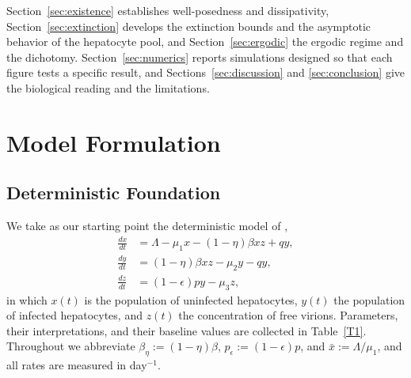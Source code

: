\documentclass{article}
\newcommand{\betaeta}{\beta_\eta}
\newcommand{\peps}{p_\epsilon}
\begin{document}
Section~\ref{sec:existence} establishes well-posedness and dissipativity, Section~\ref{sec:extinction} develops the extinction bounds and the asymptotic behavior of the hepatocyte pool, and Section~\ref{sec:ergodic} the ergodic regime and the dichotomy. Section~\ref{sec:numerics} reports simulations designed so that each figure tests a specific result, and Sections~\ref{sec:discussion} and \ref{sec:conclusion} give the biological reading and the limitations.

\section{Model Formulation}\label{sec:model}

\subsection{Deterministic Foundation}

We take as our starting point the deterministic model of \citet{Abdallah3},
\begin{equation}\label{DM}
\begin{split}
\frac{dx}{dt} &= \Lambda - \mu_1 x - (1-\eta)\beta xz + qy, \\
\frac{dy}{dt} &= (1-\eta)\beta xz - \mu_2 y - qy, \\
\frac{dz}{dt} &= (1-\epsilon)py - \mu_3 z,
\end{split}
\end{equation}
in which $x(t)$ is the population of uninfected hepatocytes, $y(t)$ the population of infected hepatocytes, and $z(t)$ the concentration of free virions. Parameters, their interpretations, and their baseline values are collected in Table~\ref{T1}. Throughout we abbreviate $\betaeta:=(1-\eta)\beta$, $\peps:=(1-\epsilon)p$, and $\bar x:=\Lambda/\mu_1$, and all rates are measured in day$^{-1}$.
\end{document}
